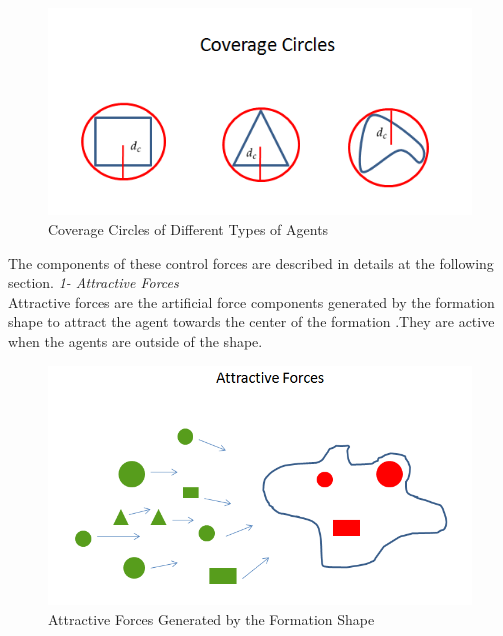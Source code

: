 \documentclass[twoside]{article}
\begin{document}
					\begin{figure}[H]
						\caption{Coverage Circles of Different Types of Agents}
						\centering
						\includegraphics[scale = 0.60]{coverage_circles}
					\end{figure}
		

		
		
		The components of these  control forces are described in details at the following section. \newline
				\textit{			1- Attractive Forces} \\ 

			Attractive forces are the artificial force components generated by the formation shape to attract the agent towards the center of the formation .They are active when the agents are outside of the shape. 
						\begin{figure}[H]
							\caption{Attractive Forces Generated by the Formation Shape}
							\centering
							\includegraphics[scale = 0.60]{attractive_forces}
						\end{figure}	
\end{document}
